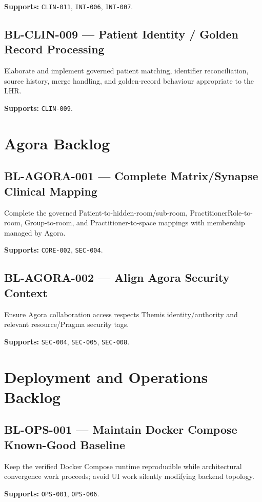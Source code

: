 \textbf{Supports:} \texttt{CLIN-011}, \texttt{INT-006}, \texttt{INT-007}.

\subsection{BL-CLIN-009 --- Patient Identity / Golden Record Processing}
Elaborate and implement governed patient matching, identifier reconciliation, source history, merge handling, and golden-record behaviour appropriate to the LHR.

\textbf{Supports:} \texttt{CLIN-009}.

\section{Agora Backlog}

\subsection{BL-AGORA-001 --- Complete Matrix/Synapse Clinical Mapping}
Complete the governed Patient-to-hidden-room/sub-room, PractitionerRole-to-room, Group-to-room, and Practitioner-to-space mappings with membership managed by Agora.

\textbf{Supports:} \texttt{CORE-002}, \texttt{SEC-004}.

\subsection{BL-AGORA-002 --- Align Agora Security Context}
Ensure Agora collaboration access respects Themis identity/authority and relevant resource/Pragma security tags.

\textbf{Supports:} \texttt{SEC-004}, \texttt{SEC-005}, \texttt{SEC-008}.

\section{Deployment and Operations Backlog}

\subsection{BL-OPS-001 --- Maintain Docker Compose Known-Good Baseline}
Keep the verified Docker Compose runtime reproducible while architectural convergence work proceeds; avoid UI work silently modifying backend topology.

\textbf{Supports:} \texttt{OPS-001}, \texttt{OPS-006}.

